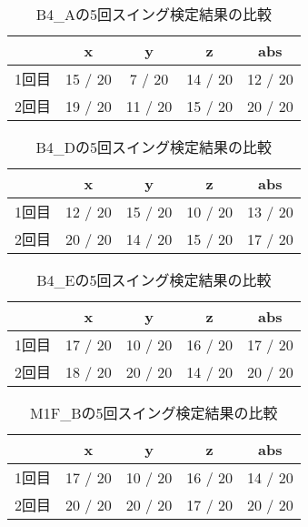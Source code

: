 \clearpage
\begin{table}[tb]
    \caption{B4_Aの5回スイング検定結果の比較}
    \vspace{0.5cm}
    \centering
    \begin{tabular}{|c|c|c|c|c|}
        \hline
        \diagbox{}{} & x & y & z & abs \\\hline
        1回目 & 15 / 20 & 7 / 20 & 14 / 20 & 12 / 20 \\
        2回目 & 19 / 20 & 11 / 20 & 15 / 20 & 20 / 20 \\
        \hline
    \end{tabular}
\end{table}
\begin{table}[tb]
    \caption{B4_Dの5回スイング検定結果の比較}
    \vspace{0.5cm}
    \centering
    \begin{tabular}{|c|c|c|c|c|}
        \hline
        \diagbox{}{} & x & y & z & abs \\\hline
        1回目 & 12 / 20 & 15 / 20 & 10 / 20 & 13 / 20 \\
        2回目 & 20 / 20 & 14 / 20 & 15 / 20 & 17 / 20 \\
        \hline
    \end{tabular}
\end{table}
\begin{table}[tb]
    \caption{B4_Eの5回スイング検定結果の比較}
    \vspace{0.5cm}
    \centering
    \begin{tabular}{|c|c|c|c|c|}
        \hline
        \diagbox{}{} & x & y & z & abs \\\hline
        1回目 & 17 / 20 & 10 / 20 & 16 / 20 & 17 / 20 \\
        2回目 & 18 / 20 & 20 / 20 & 14 / 20 & 20 / 20 \\
        \hline
    \end{tabular}
\end{table}
\begin{table}[tb]
    \caption{M1F_Bの5回スイング検定結果の比較}
    \vspace{0.5cm}
    \centering
    \begin{tabular}{|c|c|c|c|c|}
        \hline
        \diagbox{}{} & x & y & z & abs \\\hline
        1回目 & 17 / 20 & 10 / 20 & 16 / 20 & 14 / 20 \\
        2回目 & 20 / 20 & 20 / 20 & 17 / 20 & 20 / 20 \\
        \hline
    \end{tabular}
\end{table}



